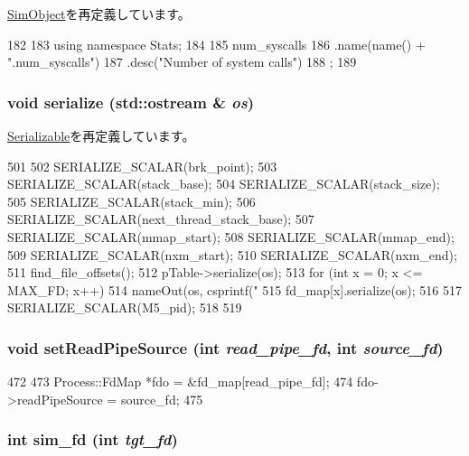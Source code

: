 \hyperlink{classSimObject_a4dc637449366fcdfc4e764cdf12d9b11}{SimObject}を再定義しています。


\begin{DoxyCode}
182 {
183     using namespace Stats;
184 
185     num_syscalls
186         .name(name() + ".num_syscalls")
187         .desc("Number of system calls")
188         ;
189 }
\end{DoxyCode}
\hypertarget{classProcess_a53e036786d17361be4c7320d39c99b84}{
\subsubsection[{serialize}]{\setlength{\rightskip}{0pt plus 5cm}void serialize (std::ostream \& {\em os})}}
\label{classProcess_a53e036786d17361be4c7320d39c99b84}


\hyperlink{classSerializable_ad6272f80ae37e8331e3969b3f072a801}{Serializable}を再定義しています。


\begin{DoxyCode}
501 {
502     SERIALIZE_SCALAR(brk_point);
503     SERIALIZE_SCALAR(stack_base);
504     SERIALIZE_SCALAR(stack_size);
505     SERIALIZE_SCALAR(stack_min);
506     SERIALIZE_SCALAR(next_thread_stack_base);
507     SERIALIZE_SCALAR(mmap_start);
508     SERIALIZE_SCALAR(mmap_end);
509     SERIALIZE_SCALAR(nxm_start);
510     SERIALIZE_SCALAR(nxm_end);
511     find_file_offsets();
512     pTable->serialize(os);
513     for (int x = 0; x <= MAX_FD; x++) {
514         nameOut(os, csprintf("%
515         fd_map[x].serialize(os);
516     }
517     SERIALIZE_SCALAR(M5_pid);
518 
519 }
\end{DoxyCode}
\hypertarget{classProcess_a06811a348d456174f7ad9f2b8f03a129}{
\subsubsection[{setReadPipeSource}]{\setlength{\rightskip}{0pt plus 5cm}void setReadPipeSource (int {\em read\_\-pipe\_\-fd}, \/  int {\em source\_\-fd})}}
\label{classProcess_a06811a348d456174f7ad9f2b8f03a129}



\begin{DoxyCode}
472 {
473     Process::FdMap *fdo = &fd_map[read_pipe_fd];
474     fdo->readPipeSource = source_fd;
475 }
\end{DoxyCode}
\hypertarget{classProcess_ac7bb7ef35884d6fb4a2c02f167ab7679}{
\subsubsection[{sim\_\-fd}]{\setlength{\rightskip}{0pt plus 5cm}int sim\_\-fd (int {\em tgt\_\-fd})}}
\label{classProcess_ac7bb7ef35884d6fb4a2c02f167ab7679}



